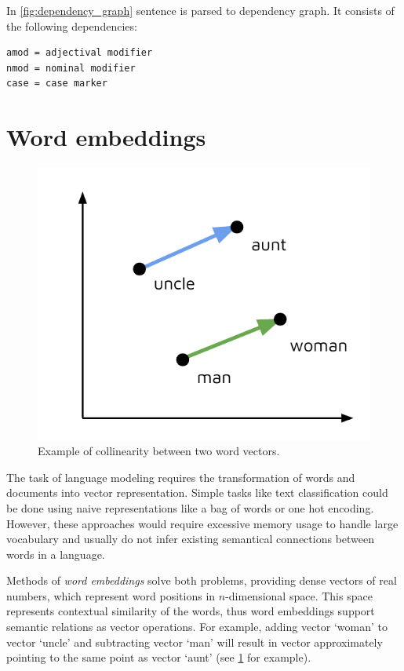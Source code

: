 In \cref{fig:dependency_graph} sentence  is parsed to dependency graph. It consists of the following dependencies: 

\begin{verbatim}
amod = adjectival modifier
nmod = nominal modifier
case = case marker
\end{verbatim}

\section{Word embeddings}

\begin{figure}[h]
\centering
\includegraphics{Figures/word_embeddings}
\decoRule
\caption[Word vectors]{Example of collinearity between two word vectors.}
\label{fig:word_embeddings}
\end{figure}

The task of language modeling requires the transformation of words and documents into vector representation. Simple tasks like text classification could be done using naive representations like a bag of words or one hot encoding. However, these approaches would require excessive memory usage to handle large vocabulary and usually do not infer existing semantical connections between words in a language. 

Methods of \emph{word embeddings} solve both problems, providing dense vectors of real numbers, which represent word positions in $n$-dimensional space. This space represents contextual similarity of the words, thus word embeddings support semantic relations as vector operations. For example, adding vector ‘woman’ to vector ‘uncle’ and subtracting vector ‘man’ will result in vector approximately pointing to the same point as vector ‘aunt’ (see \cref{fig:word_embeddings} for example).

